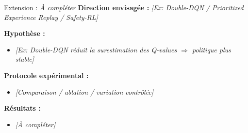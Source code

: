 \documentclass[10pt]{beamer}
\begin{document}
\begin{frame}{Extension : \textit{\`A compl\'eter}}
    \textbf{Direction envisag\'ee :} \textit{[Ex: Double-DQN / Prioritized Experience Replay / Safety-RL]}

    \vspace{0.3cm}
    \textbf{Hypoth\`ese :}
    \begin{itemize}
        \item \textit{[Ex: Double-DQN r\'eduit la surestimation des Q-values $\Rightarrow$ politique plus stable]}
    \end{itemize}

    \vspace{0.3cm}
    \textbf{Protocole exp\'erimental :}
    \begin{itemize}
        \item \textit{[Comparaison / ablation / variation contr\^ol\'ee]}
    \end{itemize}

    \vspace{0.3cm}
    \textbf{R\'esultats :}
    \begin{itemize}
        \item \textit{[\`A compl\'eter]}
    \end{itemize}
\end{frame}
\end{document}
